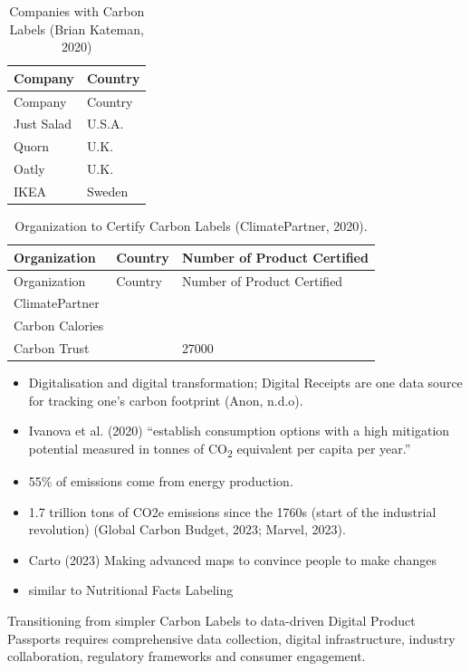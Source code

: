 \documentclass[
  letterpaper,
  DIV=11,
  numbers=noendperiod]{scrartcl}
\begin{document}
\begin{longtable}[]{@{}ll@{}}
\caption{Companies with Carbon Labels (Brian Kateman,
2020)}\tabularnewline
\toprule\noalign{}
Company & Country \\
\midrule\noalign{}
\endfirsthead
\toprule\noalign{}
Company & Country \\
\midrule\noalign{}
\endhead
\bottomrule\noalign{}
\endlastfoot
Just Salad & U.S.A. \\
Quorn & U.K. \\
Oatly & U.K. \\
IKEA & Sweden \\
\end{longtable}

\begin{longtable}[]{@{}lll@{}}
\caption{Organization to Certify Carbon Labels (ClimatePartner,
2020).}\tabularnewline
\toprule\noalign{}
Organization & Country & Number of Product Certified \\
\midrule\noalign{}
\endfirsthead
\toprule\noalign{}
Organization & Country & Number of Product Certified \\
\midrule\noalign{}
\endhead
\bottomrule\noalign{}
\endlastfoot
ClimatePartner & & \\
Carbon Calories & & \\
Carbon Trust & & 27000 \\
\end{longtable}

\begin{itemize}
\item
  Digitalisation and digital transformation; Digital Receipts are one
  data source for tracking one's carbon footprint (Anon, n.d.o).
\item
  Ivanova et al. (2020) ``establish consumption options with a high
  mitigation potential measured in tonnes of CO\textsubscript{2}
  equivalent per capita per year.''
\item
  55\% of emissions come from energy production.
\item
  1.7 trillion tons of CO2e emissions since the 1760s (start of the
  industrial revolution) (Global Carbon Budget, 2023; Marvel, 2023).
\item
  Carto (2023) Making advanced maps to convince people to make changes
\item
  similar to Nutritional Facts Labeling
\end{itemize}

Transitioning from simpler Carbon Labels to data-driven Digital Product
Passports requires comprehensive data collection, digital
infrastructure, industry collaboration, regulatory frameworks and
consumer engagement.
\end{document}
